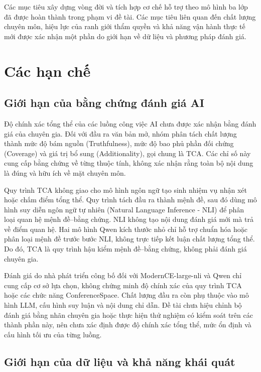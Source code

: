 Các mục tiêu xây dựng vòng đời và tích hợp cơ chế hỗ trợ theo mô hình ba lớp đã được hoàn thành trong phạm vi đề tài. Các mục tiêu liên quan đến chất lượng chuyên môn, hiệu lực của ranh giới thẩm quyền và khả năng vận hành thực tế mới được xác nhận một phần do giới hạn về dữ liệu và phương pháp đánh giá.

\section{Các hạn chế}

\subsection{Giới hạn của bằng chứng đánh giá AI}

Độ chính xác tổng thể của các luồng công việc AI chưa được xác nhận bằng đánh giá của chuyên gia. Đối với đầu ra văn bản mở, nhóm phân tách chất lượng thành mức độ bám nguồn (Truthfulness), mức độ bao phủ phần đối chứng (Coverage) và giá trị bổ sung (Additionality), gọi chung là TCA. Các chỉ số này cung cấp bằng chứng về từng thuộc tính, không xác nhận rằng toàn bộ nội dung là đúng và hữu ích về mặt chuyên môn.

Quy trình TCA không giao cho mô hình ngôn ngữ tạo sinh nhiệm vụ nhận xét hoặc chấm điểm tổng thể. Quy trình tách đầu ra thành mệnh đề, sau đó dùng mô hình suy diễn ngôn ngữ tự nhiên (Natural Language Inference - NLI) để phân loại quan hệ mệnh đề--bằng chứng. NLI không tạo nội dung đánh giá mới mà trả về điểm quan hệ. Hai mô hình Qwen kích thước nhỏ chỉ hỗ trợ chuẩn hóa hoặc phân loại mệnh đề trước bước NLI, không trực tiếp kết luận chất lượng tổng thể. Do đó, TCA là quy trình hậu kiểm mệnh đề--bằng chứng, không phải đánh giá chuyên gia.

Đánh giá do nhà phát triển công bố đối với ModernCE-large-nli và Qwen chỉ cung cấp cơ sở lựa chọn, không chứng minh độ chính xác của quy trình TCA hoặc các chức năng ConferenceSpace. Chất lượng đầu ra còn phụ thuộc vào mô hình LLM, cấu hình suy luận và nội dung chỉ dẫn. Đề tài chưa hiệu chỉnh bộ đánh giá bằng nhãn chuyên gia hoặc thực hiện thử nghiệm có kiểm soát trên các thành phần này, nên chưa xác định được độ chính xác tổng thể, mức ổn định và cấu hình tối ưu của từng luồng.

\subsection{Giới hạn của dữ liệu và khả năng khái quát}

